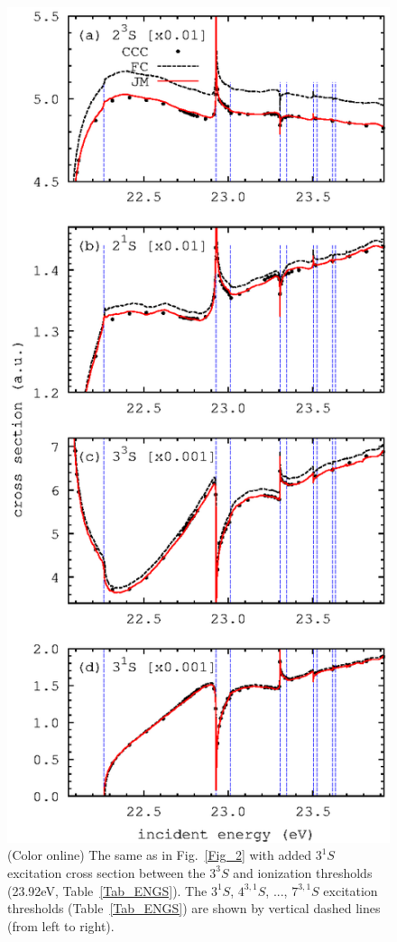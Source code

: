 \documentclass[aip
, pra
, showpacs
, aps
, twocolumn
, groupedaddress
, floatfix
]{revtex4}
\begin{document}
\begin{figure}[htb]
\includegraphics[scale=1]{fig3.ps}
\caption{(Color online)
The same as in Fig.~\ref{Fig_2} with added $3^1S$ excitation cross section
between the $3^3S$ and ionization thresholds (23.92eV, Table~\ref{Tab_ENGS}).
The $3^1S$, $4^{3,1}S$, ..., $7^{3,1}S$ excitation thresholds (Table~\ref{Tab_ENGS})
are shown by vertical dashed lines (from left to right).
}
\label{Fig_3}
\end{figure}
\end{document}
